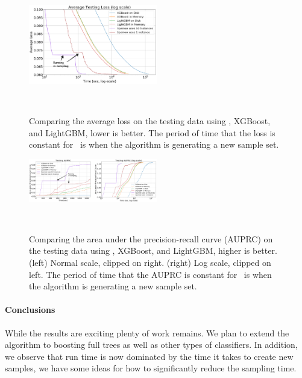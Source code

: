 \begin{figure}[t]
    \centering
    \includegraphics[width=0.5\textwidth]{figs/splice-loss.png}
    \caption{Comparing the average loss on the testing data using \Sparrow, XGBoost, and LightGBM, lower is better.
        The period of time that the loss is constant for \Sparrow\ is when the algorithm is generating a new sample set.}~\label{fig:loss}
\end{figure}



\begin{figure}[t]
    \centering
    \includegraphics[width=0.5\textwidth]{figs/splice-auprc.png}
    \caption{Comparing the area under the precision-recall curve (AUPRC) on the testing data
    using \Sparrow, XGBoost, and LightGBM, higher is better.
    (left) Normal scale, clipped on right.
    (right) Log scale, clipped on left.
    The period of time that the AUPRC is constant for \Sparrow\ is when the algorithm is generating a new sample set.}~\label{fig:auprc}
\end{figure}


\paragraph{Conclusions}
While the results are exciting plenty of work remains. We plan to
extend the algorithm to boosting full trees as well as other types of
classifiers.
In addition, we observe that run time is now dominated by the time it
takes to create new samples, we have some ideas for how to
significantly reduce the sampling time.





\iffalse

